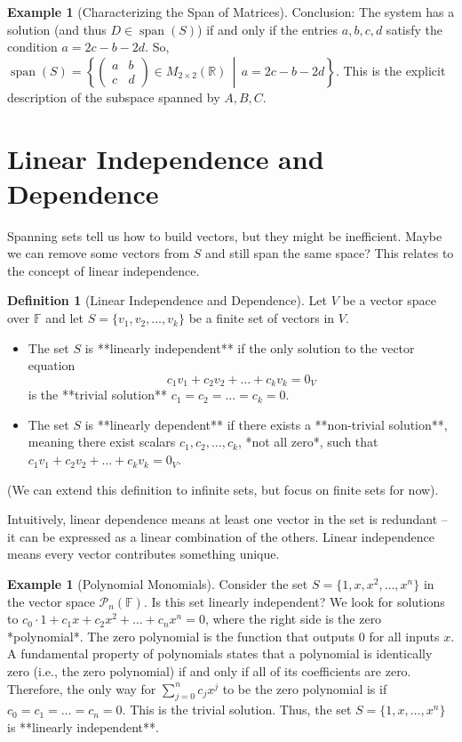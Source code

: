\documentclass[11pt]{article}
\theoremstyle{definition}
\newtheorem{definition}[theorem]{Definition}
\newtheorem{example}[theorem]{Example}
\theoremstyle{remark}
\newcommand{\R}{\mathbb{R}}
\newcommand{\F}{\mathbb{F}} %
\newcommand{\Mat}[3]{M_{#1 \times #2}(#3)}
\newcommand{\PolyN}[2]{\mathcal{P}_{#1}(#2)}
\DeclareMathOperator{\Span}{span}
\begin{document}
\begin{example}[Characterizing the Span of Matrices]
Conclusion: The system has a solution (and thus $D \in \Span(S)$) if and only if the entries $a, b, c, d$ satisfy the condition $a = 2c - b - 2d$.
So, $\Span(S) = \left\{ \begin{pmatrix} a & b \\ c & d \end{pmatrix} \in \Mat{2}{2}{\R} \, \middle| \, a = 2c - b - 2d \right\}$. This is the explicit description of the subspace spanned by $A, B, C$.
\end{example}


\section{Linear Independence and Dependence}

Spanning sets tell us how to build vectors, but they might be inefficient. Maybe we can remove some vectors from $S$ and still span the same space? This relates to the concept of linear independence.

\begin{definition}[Linear Independence and Dependence]
Let $V$ be a vector space over $\F$ and let $S = \{v_1, v_2, \dots, v_k\}$ be a finite set of vectors in $V$.
\begin{itemize}
    \item The set $S$ is **linearly independent** if the only solution to the vector equation
    \[ c_1 v_1 + c_2 v_2 + \dots + c_k v_k = 0_V \]
    is the **trivial solution** $c_1 = c_2 = \dots = c_k = 0$.
    \item The set $S$ is **linearly dependent** if there exists a **non-trivial solution**, meaning there exist scalars $c_1, c_2, \dots, c_k$, *not all zero*, such that $c_1 v_1 + c_2 v_2 + \dots + c_k v_k = 0_V$.
\end{itemize}
(We can extend this definition to infinite sets, but focus on finite sets for now).
\end{definition}

Intuitively, linear dependence means at least one vector in the set is redundant – it can be expressed as a linear combination of the others. Linear independence means every vector contributes something unique.

\begin{example}[Polynomial Monomials]
Consider the set $S = \{1, x, x^2, \dots, x^n\}$ in the vector space $\PolyN{n}{\F}$. Is this set linearly independent?
We look for solutions to $c_0 \cdot 1 + c_1 x + c_2 x^2 + \dots + c_n x^n = 0$, where the right side is the zero *polynomial*.
The zero polynomial is the function that outputs 0 for all inputs $x$. A fundamental property of polynomials states that a polynomial is identically zero (i.e., the zero polynomial) if and only if all of its coefficients are zero.
Therefore, the only way for $\sum_{j=0}^n c_j x^j$ to be the zero polynomial is if $c_0 = c_1 = \dots = c_n = 0$.
This is the trivial solution. Thus, the set $S = \{1, x, \dots, x^n\}$ is **linearly independent**.
\end{example}
\end{document}
